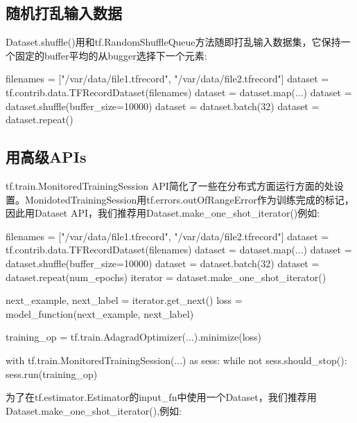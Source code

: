 \subsection{随机打乱输入数据}
Dataset.shuffle()用和tf.RandomShuffleQueue方法随即打乱输入数据集，它保持一个固定的buffer平均的从bugger选择下一个元素:
\begin{python}
filenames = ["/var/data/file1.tfrecord", "/var/data/file2.tfrecord"]
dataset = tf.contrib.data.TFRecordDataset(filenames)
dataset = dataset.map(...)
dataset = dataset.shuffle(buffer_size=10000)
dataset = dataset.batch(32)
dataset = dataset.repeat()
\end{python}
\subsection{用高级APIs}
tf.train.MonitoredTrainingSession API简化了一些在分布式方面运行方面的处设置。MonidotedTrainingSession用tf.errors.outOfRangeError作为训练完成的标记，因此用Dataset API，我们推荐用Dataset.make\_one\_shot\_iterator()例如:
\begin{python}
filenames = ["/var/data/file1.tfrecord", "/var/data/file2.tfrecord"]
dataset = tf.contrib.data.TFRecordDataset(filenames)
dataset = dataset.map(...)
dataset = dataset.shuffle(buffer\_size=10000)
dataset = dataset.batch(32)
dataset = dataset.repeat(num_epochs)
iterator = dataset.make_one_shot_iterator()

next_example, next_label = iterator.get_next()
loss = model_function(next_example, next_label)

training_op = tf.train.AdagradOptimizer(...).minimize(loss)

with tf.train.MonitoredTrainingSession(...) as sess:
    while not sess.should_stop():
        sess.run(training_op)
\end{python}
为了在tf.estimator.Estimator的input\_fn中使用一个Dataset，我们推荐用Dataset.make\_one\_shot\_iterator(),例如:
